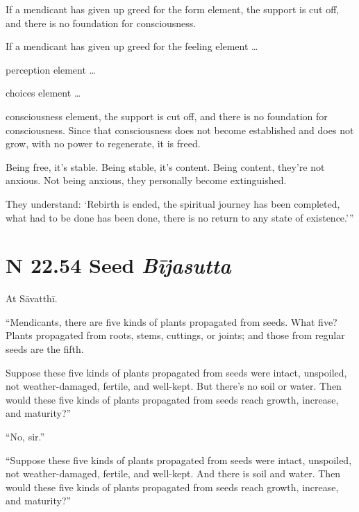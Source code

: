\documentclass[12pt,openany]{book}%
\newcommand*{\suttatitleacronym}[1]{\smaller[2]{#1}\vspace*{.3em}}
\newcommand*{\suttatitletranslation}[1]{\linebreak{#1}}
\newcommand*{\suttatitleroot}[1]{\linebreak\smaller[2]\itshape{#1}}
\newcommand*{\tocacronym}[1]{\hspace*{-3.3em}{#1}\quad}
\newcommand*{\toctranslation}[1]{#1}
\newcommand*{\tocroot}[1]{(\textit{#1})}
\begin{document}
If a mendicant has given up greed for the form element, the support is cut off, and there is no foundation for consciousness. 

If a mendicant has given up greed for the feeling element … 

perception element … 

choices element … 

consciousness element, the support is cut off, and there is no foundation for consciousness. Since that consciousness does not become established and does not grow, with no power to regenerate, it is freed. 

Being free, it’s stable. Being stable, it’s content. Being content, they’re not anxious. Not being anxious, they personally become extinguished. 

They understand: ‘Rebirth is ended, the spiritual journey has been completed, what had to be done has been done, there is no return to any state of existence.’” 

%
\section*{{\suttatitleacronym SN 22.54}{\suttatitletranslation A Seed }{\suttatitleroot Bījasutta}}
\addcontentsline{toc}{section}{\tocacronym{SN 22.54} \toctranslation{A Seed } \tocroot{Bījasutta}}

At \textsanskrit{Sāvatthī}. 

“Mendicants, there are five kinds of plants propagated from seeds. What five? Plants propagated from roots, stems, cuttings, or joints; and those from regular seeds are the fifth. 

Suppose these five kinds of plants propagated from seeds were intact, unspoiled, not weather-damaged, fertile, and well-kept. But there’s no soil or water. Then would these five kinds of plants propagated from seeds reach growth, increase, and maturity?” 

“No, sir.” 

“Suppose these five kinds of plants propagated from seeds were intact, unspoiled, not weather-damaged, fertile, and well-kept. And there is soil and water. Then would these five kinds of plants propagated from seeds reach growth, increase, and maturity?” 
\end{document}
